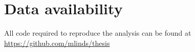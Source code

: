\chapter{Data availability}
All code required to reproduce the analysis can be found at \url{https://github.com/mlinds/thesis}


